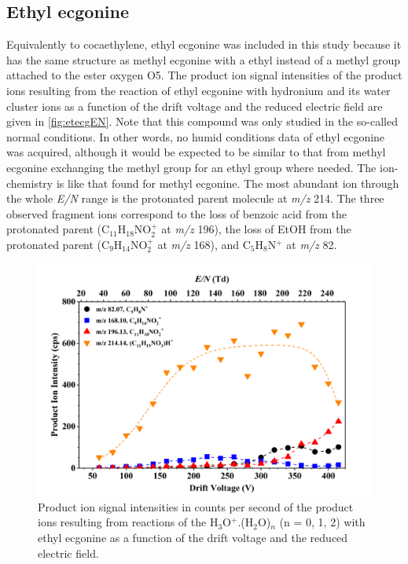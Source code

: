  
 




\subsection{Ethyl ecgonine}

Equivalently to cocaethylene, ethyl ecgonine was included in this study because it has the same structure as methyl ecgonine with a ethyl  instead of a methyl group attached to the ester oxygen O5.
%
The product ion signal intensities of the product ions resulting from the reaction of ethyl ecgonine with hydronium and its water cluster ions as a function of the drift voltage and the reduced electric field are given in \autoref{fig:etecgEN}.
%
Note that this compound was only studied in the so-called normal conditions. In other words, no humid conditions data of ethyl ecgonine was acquired, although it would be expected to be similar to that from methyl ecgonine exchanging the methyl group for an ethyl group where needed.
%
The ion-chemistry is like that found for methyl ecgonine.
%
The most abundant ion through the whole \textit{E/N} range is the protonated parent molecule at \textit{m/z} 214.
%
The three observed fragment ions correspond to
the loss of benzoic acid from the protonated parent (C$_{11}$H$_{18}$NO$_2^+$ at \textit{m/z} 196),
the loss of EtOH from the protonated parent (C$_{9}$H$_{14}$NO$_2^+$ at \textit{m/z} 168),
and C$_5$H$_8$N$^+$ at \textit{m/z} 82.











\begin{figure}[htbp]
\centering
\includegraphics[width=0.8\linewidth]{pics/cocaine-chapter/EtEcg-cps.png}
\caption{Product ion signal intensities in counts per second of the product ions resulting from reactions of the H$_3$O$^+$.(H$_2$O)$_n$ (n = 0, 1, 2) with ethyl ecgonine as a function of the drift voltage and the reduced electric field.} 
\label{fig:etecgEN}
\end{figure}


